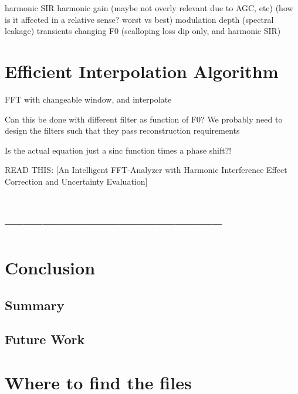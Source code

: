 \documentclass [11pt, proquest] {uwthesis}[2015/03/03]
\begin{document}
harmonic SIR
harmonic gain (maybe not overly relevant due to AGC, etc)
					(how is it affected in a relative sense? worst vs best)
modulation depth (spectral leakage)
transients
changing F0 (scalloping loss dip only, and harmonic SIR)




\chapter{Efficient Interpolation Algorithm}

FFT with changeable window, and interpolate

Can this be done with different filter as function of F0?
We probably need to design the filters such that they pass reconstruction requirements

Is the actual equation just a sinc function times a phase shift?!

READ THIS: [An Intelligent FFT-Analyzer with Harmonic Interference Effect Correction and Uncertainty Evaluation]

\chapter{-----------------------------------}



\chapter{Conclusion}

\section{Summary}

\section{Future Work}



%
%
\nocite{*}   %


%
%
\appendix
\raggedbottom\sloppy
 
 
\chapter{Where to find the files}
 
\end{document}
